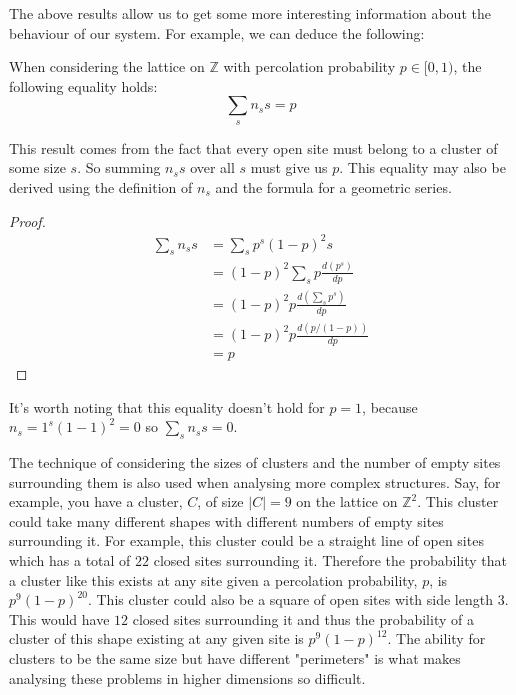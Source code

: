 The above results allow us to get some more interesting information about the behaviour of our system. For example, we can deduce the following:
\begin{corollary}
  When considering the lattice on $\mathbb{Z}$ with percolation probability $p \in [0, 1)$, the following equality holds:
  $$\sum_sn_ss = p$$
\end{corollary}
This result comes from the fact that every open site must belong to a cluster of some size $s$. So summing $n_ss$ over all $s$ must give us $p$. This equality may also be derived
using the definition of $n_s$ and the formula for a geometric series.

\begin{proof}
  \begin{align*}
    \sum_sn_ss &= \sum_sp^s(1-p)^2s \\
    &= (1-p)^2\sum_sp\frac{d(p^s)}{dp} \\
    &= (1-p)^2p\frac{d(\sum_sp^s)}{dp} \\
    &= (1-p)^2p\frac{d(p/(1-p))}{dp} \\
    &= p
  \end{align*}
\end{proof}

It's worth noting that this equality doesn't hold for $p=1$, because $n_s=1^s(1-1)^2=0$ so $\sum_sn_ss = 0$.

The technique of considering the sizes of clusters and the number of
empty sites surrounding them is also used when analysing more complex structures. Say, for example, you have a cluster, $C$, of size $|C|=9$ on the lattice on $\mathbb{Z}^2$. This
cluster could take many different shapes with different numbers of empty sites surrounding it. For example, this cluster could be a straight line of open sites which has a total of
$22$ closed sites surrounding it. Therefore the probability that a cluster like this exists at any site given a percolation probability, $p$, is $p^{9}(1-p)^{20}$. This cluster could also be a
square of open sites with side length $3$. This would have $12$ closed sites surrounding it and thus the probability of a cluster of this shape existing at any given site is
$p^{9}(1-p)^{12}$. The ability for clusters to be the same size but have different "perimeters" is what makes analysing these problems in higher dimensions so difficult.
